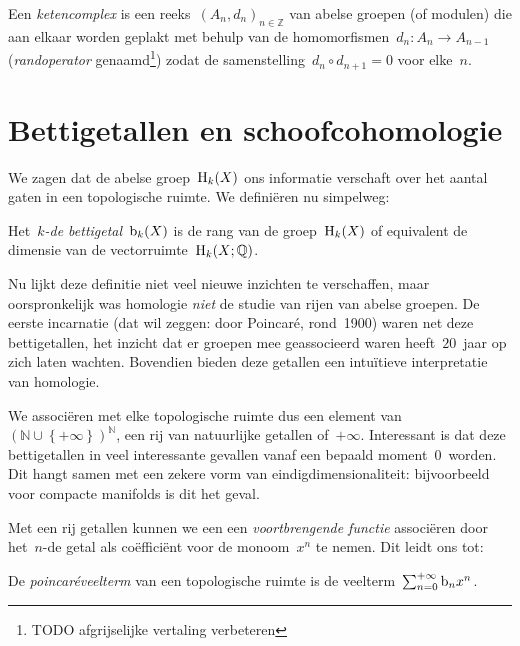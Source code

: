 \documentclass[a4paper,11pt]{article}
\begin{document}
\begin{definition}
  Een \emph{ketencomplex} is een reeks~$(A_n,d_n)_{n\in\mathbb{Z}}$ van abelse groepen (of modulen) die aan elkaar worden geplakt met behulp van de homomorfismen~$d_n\colon A_n\to A_{n-1}$ (\emph{randoperator} genaamd\footnote{TODO afgrijselijke vertaling verbeteren}) zodat de samenstelling~$d_n\circ d_{n+1}=0$ voor elke~$n$.
\end{definition}



\section{Bettigetallen en schoofcohomologie}
\label{section:betti-numbers}
We zagen dat de abelse groep~$\mathrm{H}_k(X)$ ons informatie verschaft over het aantal gaten in een topologische ruimte. We defini\"eren nu simpelweg:
\begin{definition}
  Het~\emph{$k$\nobreakdash-de bettigetal~$\mathrm{b}_k(X)$} is de rang van de groep~$\mathrm{H}_k(X)$ of equivalent de dimensie van de vectorruimte~$\mathrm{H}_k(X;\mathbb{Q})$.
\end{definition}

Nu lijkt deze definitie niet veel nieuwe inzichten te verschaffen, maar oorspronkelijk was homologie \emph{niet} de studie van rijen van abelse groepen. De eerste incarnatie (dat wil zeggen: door Poincar\'e, rond~1900) waren net deze bettigetallen, het inzicht dat er groepen mee geassocieerd waren heeft~$20$~jaar op zich laten wachten. Bovendien bieden deze getallen een intu\"itieve interpretatie van homologie.

We associ\"eren met elke topologische ruimte dus een element van~$(\mathbb{N}\cup\left\{ +\infty \right\})^\mathbb{N}$, een rij van natuurlijke getallen of~$+\infty$. Interessant is dat deze bettigetallen in veel interessante gevallen vanaf een bepaald moment~$0$~worden. Dit hangt samen met een zekere vorm van eindigdimensionaliteit: bijvoorbeeld voor compacte manifolds is dit het geval.

Met een rij getallen kunnen we een een \emph{voortbrengende functie} associ\"eren door het~$n$\nobreakdash-de getal als co\"effici\"ent voor de monoom~$x^n$ te nemen. Dit leidt ons tot:

\begin{definition}
  De \emph{poincar\'eveelterm} van een topologische ruimte is de veelterm~$\sum_{n=0}^{+\infty}\mathrm{b}_n x^n$.
\end{definition}
\end{document}
